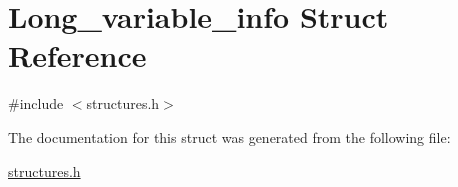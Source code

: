 \hypertarget{structLong__variable__info}{}\section{Long\+\_\+variable\+\_\+info Struct Reference}
\label{structLong__variable__info}


{\ttfamily \#include $<$structures.\+h$>$}



The documentation for this struct was generated from the following file\+:\begin{DoxyCompactItemize}
\item 
\hyperlink{structures_8h}{structures.\+h}\end{DoxyCompactItemize}
